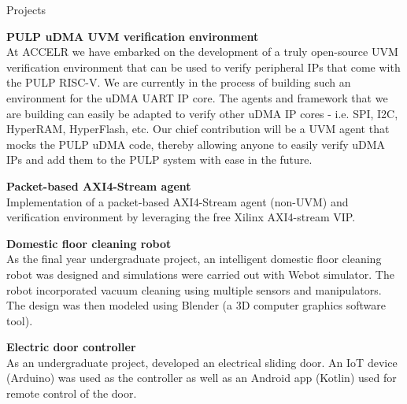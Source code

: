 \documentclass[
	11pt, %
]{./../assets/resume} %
\begin{document}

\begin{rSection}{Projects}

	\textbf{PULP uDMA UVM verification environment} \\
	At ACCELR we have embarked on the development of a truly open-source UVM verification environment that can be used to verify peripheral IPs that come with the PULP RISC-V. We are currently in the process of building such an environment for the uDMA UART IP core. The agents and framework that we are building can easily be adapted to verify other uDMA IP cores - i.e. SPI, I2C, HyperRAM, HyperFlash, etc. Our chief contribution will be a UVM agent that mocks the PULP uDMA code, thereby allowing anyone to easily verify uDMA IPs and add them to the PULP system with ease in the future.

	\textbf{Packet-based AXI4-Stream agent} \\
	Implementation of a packet-based AXI4-Stream agent (non-UVM) and verification environment by leveraging the free Xilinx AXI4-stream VIP.

	\textbf{Domestic floor cleaning robot} \\
	As the final year undergraduate project, an intelligent domestic floor cleaning robot was designed and simulations were carried out with Webot simulator. The robot incorporated vacuum cleaning using multiple sensors and manipulators. The design was then modeled using Blender (a 3D computer graphics software tool).

	\textbf{Electric door controller} \\
	As an undergraduate project, developed an electrical sliding door. An IoT device (Arduino) was used as the controller as well as an Android app (Kotlin) used for remote control of the door.

\end{rSection}




\end{document}
